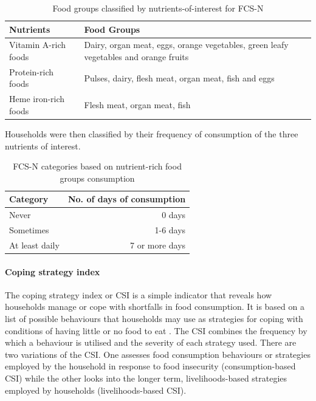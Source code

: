 \documentclass[12pt,a4paper]{article}
\let\oldparagraph\paragraph
\renewcommand{\paragraph}[1]{\oldparagraph{#1}\mbox{}}
\begin{document}
\begin{table}[H]

\caption{\label{tab:fcs3}Food groups classified by nutrients-of-interest for FCS-N}
\centering
\begin{tabular}[t]{l>{\raggedright\arraybackslash}p{8cm}}
\toprule
\textbf{Nutrients} & \textbf{Food Groups}\\
\midrule
\rowcolor{gray!6}  Vitamin A-rich foods & Dairy, organ meat, eggs, orange vegetables, green leafy vegetables and orange fruits\\
Protein-rich foods & Pulses, dairy, flesh meat, organ meat, fish and eggs\\
\rowcolor{gray!6}  Heme iron-rich foods & Flesh meat, organ meat, fish\\
\bottomrule
\end{tabular}
\end{table}

Households were then classified by their frequency of consumption of the three nutrients of interest.

\begin{table}[H]

\caption{\label{tab:fcs4}FCS-N categories based on nutrient-rich food groups consumption}
\centering
\begin{tabular}[t]{lr}
\toprule
\textbf{Category} & \textbf{No. of days of consumption}\\
\midrule
\rowcolor{gray!6}  Never & 0 days\\
Sometimes & 1-6 days\\
\rowcolor{gray!6}  At least daily & 7 or more days\\
\bottomrule
\end{tabular}
\end{table}

\hypertarget{csi}{%
\paragraph{Coping strategy index}\label{csi}}

The coping strategy index or CSI is a simple indicator that reveals how households manage or cope with shortfalls in food consumption. It is based on a list of possible behaviours that households may use as strategies for coping with conditions of having little or no food to eat \citep{Maxwell:2008vh}. The CSI combines the frequency by which a behaviour is utilised and the severity of each strategy used. There are two variations of the CSI. One assesses food consumption behaviours or strategies employed by the household in response to food insecurity (consumption-based CSI) while the other looks into the longer term, livelihoods-based strategies employed by households (livelihoods-based CSI).
\end{document}
